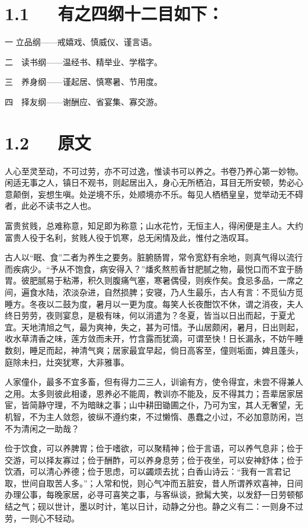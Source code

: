 \documentclass[letterpaper,10pt,english]{sphinxmanual}
\begin{document}
\section{1.1   有之四纲十二目如下：}
\label{\detokenize{p00_u5176_u5b83/_u5f20_u82f1-_u806a_u8bad_u658b_u8bed:id3}}
一 立品纲——戒嬉戏、慎威仪、谨言语。

二　读书纲——温经书、精举业、学楷字。

三　养身纲——谨起居、慎寒暑、节用度。

四　择友纲——谢酬应、省宴集、寡交游。


\section{1.2   原文}
\label{\detokenize{p00_u5176_u5b83/_u5f20_u82f1-_u806a_u8bad_u658b_u8bed:id4}}
人心至灵至动，不可过劳，亦不可过逸，惟读书可以养之。书卷乃养心第一妙物。闲适无事之人，镇日不观书，则起居出入，身心无所栖泊，耳目无所安顿，势必心意颠倒，妄想生嗔。处逆境不乐，处顺境亦不乐。每见人栖栖皇皇，觉举动无不碍者，此必不读书之人也。

富贵贫贱，总难称意，知足即为称意；山水花竹，无恒主人，得闲便是主人。大约富贵人役于名利，贫贱人役于饥寒，总无闲情及此，惟付之浩叹耳。

古人以“眠、食”二者为养生之要务。脏腑肠胃，常令宽舒有余地，则真气得以流行而疾病少。“予从不饱食，病安得入？”燔炙熬煎香甘肥腻之物，最悦口而不宜于肠胃。彼肥腻易于粘滞，积久则腹痛气塞，寒暑偶侵，则疾作矣。食忌多品，一席之间，遍食水陆，浓淡杂进，自然损脾；安寝，乃人生最乐，古人有言：不觅仙方觅睡方。冬夜以二鼓为度，暑月以一更为度。每笑人长夜酣饮不休，谓之消夜，夫人终日劳劳，夜则宴息，是极有味，何以消遣为？冬夏，皆当以日出而起，于夏尤宜。天地清旭之气，最为爽神，失之，甚为可惜。予山居颇闲，暑月，日出则起，收水草清香之味，莲方敛而未开，竹含露而犹滴，可谓至快！日长漏永，不妨午睡数刻，睡足而起，神清气爽；居家最宜早起，倘日高客至，僮则垢面，婢且蓬头，庭除未扫，灶突犹寒，大非雅事。

人家僮仆，最多不宜多畜，但有得力二三人，训谕有方，使令得宜，未尝不得兼人之用。太多则彼此相诿，恩养必不能周，教训亦不能及，反不得其力；吾辈居家居宦，皆简静守理，不为暗昧之事；山中耕田锄圃之仆，乃可为宝，其人无奢望，无机智，不为主人敛怨，彼纵不遵约束，不过懒惰、愚蠢之小过，不必加意防闲，岂不为清闲之一助哉？

俭于饮食，可以养脾胃；俭于嗜欲，可以聚精神；俭于言语，可以养气息非；俭于交游，可以择友寡过；俭于酬酢，可以养身息劳；俭于夜坐，可以安神舒体；俭于饮酒，可以清心养德；俭于思虑，可以蠲烦去扰；白香山诗云：“我有一言君记取，世间自取苦人多。”；人常和悦，则心气冲而五脏安，昔人所谓养欢喜神，日间办理公事，每晚家居，必寻可喜笑之事，与客纵谈，掀髯大笑，以发舒一日劳顿郁结之气；砚以世计，墨以时计，笔以日计，动静之分也。静之义有二：一则身不过劳，一则心不轻动。
\end{document}

